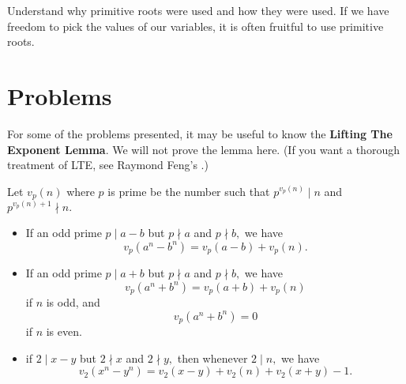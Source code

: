 \documentclass[blue,onecol]{shooting}
\begin{document}
Understand why primitive roots were used and how they were used. If we have freedom to pick the values of our variables, it is often fruitful to use primitive roots.

\pagebreak

\section{Problems}

For some of the problems presented, it may be useful to know the \textbf{Lifting The Exponent Lemma}. We will not prove the lemma here. (If you want a thorough treatment of LTE, see Raymond Feng's .)

\begin{theo}
Let $v_p(n)$ where $p$ is prime be the number such that $p^{v_p(n)} \mid n$ and $p ^{v_p(n)+1} \nmid n.$

\begin{itemize}
    \item If an odd prime $p \mid a-b$ but $p \nmid a$ and $p \nmid b,$ we have $$v_p(a^n - b^n) = v_p(a-b)+v_p(n).$$
    
    \item If an odd prime $p \mid a+b$ but $p \nmid a$ and $p \nmid b,$ we have $$v_p(a^n + b^n) = v_p(a+b)+v_p(n)$$ if $n$ is odd, and $$v_p(a^n + b^n) = 0$$ if $n$ is even.
    
    \item if $2 \mid x - y$ but $2 \nmid x$ and $2 \nmid y,$ then whenever $2 \mid n,$ we have $$v_2(x^n-y^n) = v_2(x-y)+v_2(n)+v_2(x+y)-1.$$
\end{itemize}
\end{theo}

\noindent{}

     



\end{document}
